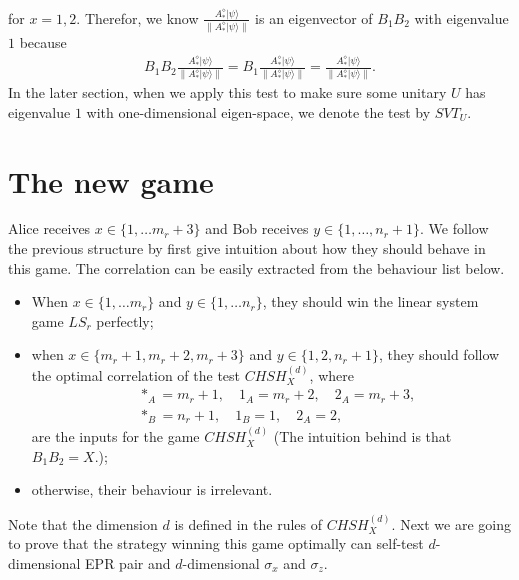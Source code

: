 \documentclass[11pt,letterpaper]{article}
\newcommand{\ket}[1]{|#1\rangle}
\newcommand{\1}{\mathbb{1}}
\newcommand{\CHSH}{CHSH^{(d)}}
\newcommand{\SVT}{SVT}
\theoremstyle{definition}
\begin{document}
for $x = 1,2$.
Therefor, we know $ \frac{A_\ast^\diamond \ket{\psi}}{\| A_\ast^\diamond \ket{\psi}\|} $ is an eigenvector of $B_1B_2$ with eigenvalue $1$ because
\begin{align}
	B_1B_2 \frac{A_\ast^\diamond \ket{\psi}}{\| A_\ast^\diamond \ket{\psi}\|} = B_1 \frac{A_\ast^\diamond \ket{\psi}}{\| A_\ast^\diamond \ket{\psi}\|} =  \frac{A_\ast^\diamond \ket{\psi}}{\| A_\ast^\diamond \ket{\psi}\|}.
\end{align}
In the later section, when we apply this test to make sure some unitary $U$ has eigenvalue $1$ with one-dimensional eigen-space, we denote the test by $\SVT_U$.
\section{The new game} 
\label{sec:main}

Alice receives $x \in \{1,\dots m_r+3 \}$ and Bob receives
$y \in \{1,\dots,n_r+1\}$. We follow the previous structure by first give intuition about how they should
behave in this game. The correlation can be easily extracted from the behaviour list below.
\begin{itemize}
	\item When $x \in \{1,\dots m_r\}$ and $y \in \{1, \dots n_r\}$, they should win the 
	linear system game $LS_r$ perfectly;
	\item when $x \in \{m_r+1, m_r+2, m_r+3\}$ and $y \in \{1, 2, n_r+1\}$, they should follow the
	optimal correlation of the test $\CHSH_X$, where 
	\begin{align}
		&\ast_A = m_r+1, \quad 1_A = m_r+2,\quad 2_A = m_r+3,\\
		&\ast_B = n_r+1,\quad 1_B = 1, \quad 2_A = 2,
	\end{align}
	are the inputs for the game $\CHSH_X$
	(The intuition behind is that $B_1B_2 = X$.);
	\item otherwise, their behaviour is irrelevant.
\end{itemize}
Note that the dimension $d$ is defined in the rules of $\CHSH_X$.
Next we are going to prove that the strategy winning this game optimally can self-test $d$-dimensional EPR pair and 
$d$-dimensional $\sigma_x$ and $\sigma_z$.
\end{document}
